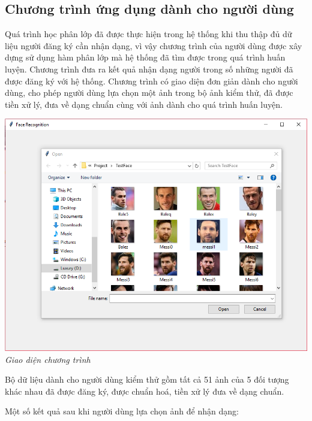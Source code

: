 \documentclass[12pt,a4paper]{article}
\begin{document}
\subsection{Chương trình ứng dụng dành cho người dùng}
Quá trình học phân lớp đã được thực hiện trong hệ thống khi thu thập đủ dữ liệu người đăng ký cần nhận dạng, vì vậy chương trình của người dùng được xây dựng sử dụng hàm phân lớp mà hệ thống đã tìm được trong quá trình huấn luyện. Chương trình đưa ra kết quả nhận dạng người trong số những người đã được đăng ký với hệ thống. Chương trình có giao diện đơn giản dành cho người dùng, cho phép người dùng lựa chọn một ảnh trong bộ ảnh kiểm thử, đã được tiền xử lý, đưa về dạng chuẩn cùng với ảnh dành cho quá trình huấn luyện. 
\begin{center}
\includegraphics[scale=0.7]{36.png}\\
\textit{Giao diện chương trình}
\end{center} 
\par 
Bộ dữ liệu dành cho người dùng kiểm thử gồm tất cả 51 ảnh của 5 đối tượng khác nhau đã được đăng ký, được chuẩn hoá, tiền xử lý đưa về dạng chuẩn.\par 
Một số kết quả sau khi người dùng lựa chọn ảnh để nhận dạng:
\end{document}
